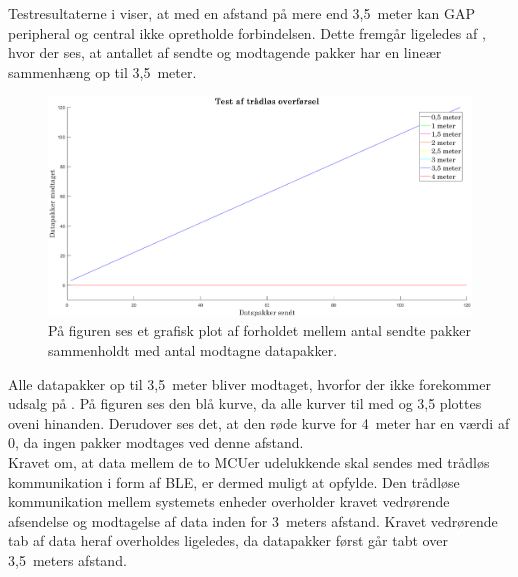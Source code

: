 Testresultaterne i  viser, at med en afstand på mere end 3,5~meter kan GAP peripheral og central ikke opretholde forbindelsen. Dette fremgår ligeledes af , hvor der ses, at antallet af sendte og modtagende pakker har en lineær sammenhæng op til 3,5~meter.
\begin{figure}[H]
	\centering
	\includegraphics[scale=0.35]{figures/cDesign/test_ble.png}
	\caption{På figuren ses et grafisk plot af forholdet mellem antal sendte pakker sammenholdt med antal modtagne datapakker. }
	\label{fig:test_ble}
\end{figure}\vspace{-.25cm}
Alle datapakker op til 3,5~meter bliver modtaget, hvorfor der ikke forekommer udsalg på . På figuren ses den blå kurve, da alle kurver til med og 3,5 plottes oveni hinanden. Derudover ses det, at den røde kurve for 4~meter har en værdi af 0, da ingen pakker modtages ved denne afstand. \\
Kravet om, at data mellem de to MCUer udelukkende skal sendes med trådløs kommunikation i form af BLE, er dermed muligt at opfylde. Den trådløse kommunikation mellem systemets enheder overholder kravet vedrørende afsendelse og modtagelse af data inden for 3~meters afstand. Kravet vedrørende tab af data heraf overholdes ligeledes, da datapakker først går tabt over 3,5~meters afstand.
